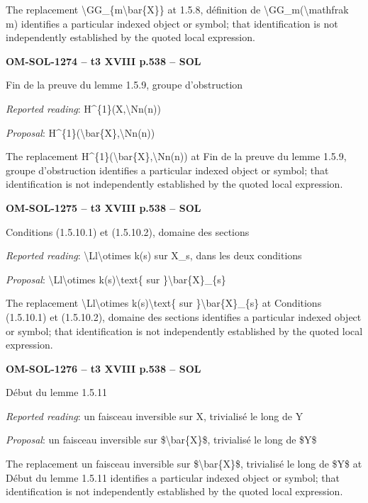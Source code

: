 The replacement \textbackslash{}GG\_\{m\textbackslash{}bar\{X\}\} at 1.5.8, définition de \textbackslash{}GG\_m(\textbackslash{}mathfrak m) identifies a particular indexed object or symbol; that identification is not independently established by the quoted local expression.\par
\par\noindent\textbf{OM-SOL-1274 -- t3 XVIII p.538 -- SOL}\par
Fin de la preuve du lemme 1.5.9, groupe d'obstruction\par
\emph{Reported reading}: H\textasciicircum{}\{1\}(X,\textbackslash{}Nn(n))\par
\emph{Proposal}: H\textasciicircum{}\{1\}(\textbackslash{}bar\{X\},\textbackslash{}Nn(n))\par
The replacement H\textasciicircum{}\{1\}(\textbackslash{}bar\{X\},\textbackslash{}Nn(n)) at Fin de la preuve du lemme 1.5.9, groupe d'obstruction identifies a particular indexed object or symbol; that identification is not independently established by the quoted local expression.\par
\par\noindent\textbf{OM-SOL-1275 -- t3 XVIII p.538 -- SOL}\par
Conditions (1.5.10.1) et (1.5.10.2), domaine des sections\par
\emph{Reported reading}: \textbackslash{}Ll\textbackslash{}otimes k(s) sur X\_s, dans les deux conditions\par
\emph{Proposal}: \textbackslash{}Ll\textbackslash{}otimes k(s)\textbackslash{}text\{ sur \}\textbackslash{}bar\{X\}\_\{s\}\par
The replacement \textbackslash{}Ll\textbackslash{}otimes k(s)\textbackslash{}text\{ sur \}\textbackslash{}bar\{X\}\_\{s\} at Conditions (1.5.10.1) et (1.5.10.2), domaine des sections identifies a particular indexed object or symbol; that identification is not independently established by the quoted local expression.\par
\par\noindent\textbf{OM-SOL-1276 -- t3 XVIII p.538 -- SOL}\par
Début du lemme 1.5.11\par
\emph{Reported reading}: un faisceau inversible sur X, trivialisé le long de Y\par
\emph{Proposal}: un faisceau inversible sur \$\textbackslash{}bar\{X\}\$, trivialisé le long de \$Y\$\par
The replacement un faisceau inversible sur \$\textbackslash{}bar\{X\}\$, trivialisé le long de \$Y\$ at Début du lemme 1.5.11 identifies a particular indexed object or symbol; that identification is not independently established by the quoted local expression.\par
